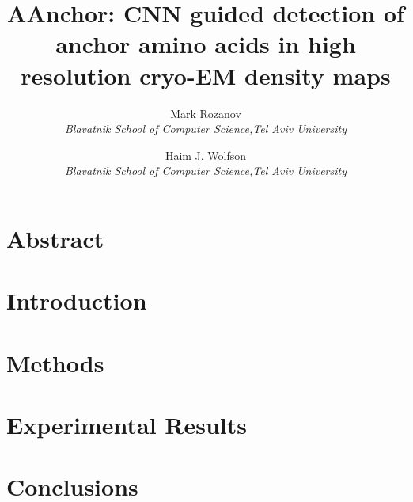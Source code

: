 \documentclass[twocolumn, 10pt]{article}
\begin{document}
\title{AAnchor: CNN guided detection of anchor amino acids in high resolution cryo-EM density maps} 

\author{Mark Rozanov\\  \textit{Blavatnik School of Computer Science,Tel Aviv University} \\
\and Haim J. Wolfson  \\ \textit{Blavatnik School of Computer Science,Tel Aviv University}}



\newpage
{}

%
\twocolumn
\maketitle

\section{Abstract}



\section{Introduction}

\section{Methods}

\section{Experimental Results}

%
\section{Conclusions}



\end{document}
